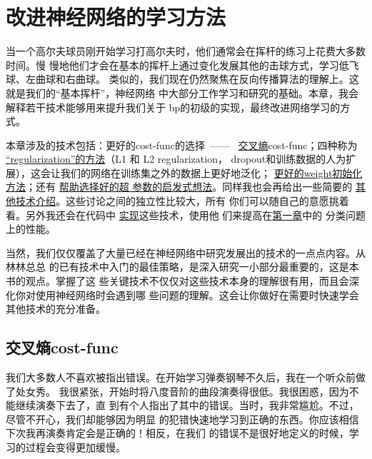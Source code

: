 
\chapter{改进神经网络的学习方法}
\label{ch:ImprovingTheWayNeuralNetworksLearn}

当一个高尔夫球员刚开始学习打高尔夫时，他们通常会在挥杆的练习上花费大多数时间。慢
慢地他们才会在基本的挥杆上通过变化发展其他的击球方式，学习低飞球、左曲球和右曲球。
类似的，我们现在仍然聚焦在反向传播算法的理解上。这就是我们的“基本挥杆”，神经网络
中大部分工作学习和研究的基础。本章，我会解释若干技术能够用来提升我们关于%
\gls*{bp}的初级的实现，最终改进网络学习的方式。

本章涉及的技术包括：更好的\gls*{cost-func}的选择~——~%
\hyperref[sec:the_cross-entropy_cost_function]{交叉熵}\gls*{cost-func}；四种称为%
\hyperref[sec:overfitting_and_regularization]{“\gls*{regularization}”的方法}（L1 和 L2 \gls*{regularization}，
  \gls*{dropout}和训练数据的人为扩展），这会让我们的网络在训练集之外的数据上更好地泛化；%
\hyperref[sec:weight_initialization]{更好的\gls*{weight}初始化方法}；还有%
\hyperref[sec:how_to_choose_a_neural_network's_hyper-parameters]{帮助选择好的超
  参数的启发式想法}。同样我也会再给出一些简要的%
\hyperref[sec:other_techniques]{其他技术介绍}。这些讨论之间的独立性比较大，所有
你们可以随自己的意愿挑着看。另外我还会在代码中%
\hyperref[sec:handwriting_recognition_revisited_the_code]{实现}这些技术，使用他
们来提高在\hyperref[ch:UsingNeuralNetsToRecognizeHandwrittenDigits]{第一章}中的
分类问题上的性能。

当然，我们仅仅覆盖了大量已经在神经网络中研究发展出的技术的一点点内容。从林林总总
的已有技术中入门的最佳策略，是深入研究一小部分最重要的，这是本书的观点。掌握了这
些关键技术不仅仅对这些技术本身的理解很有用，而且会深化你对使用神经网络时会遇到哪
些问题的理解。这会让你做好在需要时快速学会其他技术的充分准备。

\section{交叉熵\gls*{cost-func}}
\label{sec:the_cross-entropy_cost_function}

我们大多数人不喜欢被指出错误。在开始学习弹奏钢琴不久后，我在一个听众前做了处女秀。
我很紧张，开始时将八度音阶的曲段演奏得很低。我很困惑，因为不能继续演奏下去了，直
到有个人指出了其中的错误。当时，我非常尴尬。不过，尽管不开心，我们却能够因为明显
的犯错快速地学习到正确的东西。你应该相信下次我再演奏肯定会是正确的！相反，在我们
的错误不是很好地定义的时候，学习的过程会变得更加缓慢。

